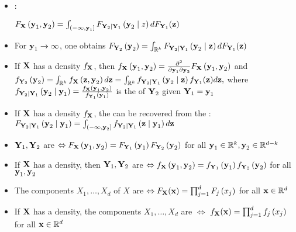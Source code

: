 \begin{itemize}[leftmargin=*]
    \item {}:
    
$
F_{\vect{X}}\left(\vect{y}_{1}, \vect{y}_{2}\right)=\int_{\left(-\infty, \vect{y}_{1}\right]} F_{\vect{Y}_{2} \mid \vect{Y}_{1}}\left(\vect{y}_{2} \mid z\right) d F_{\vect{Y}_{1}}(\vect{z})
$
    \item For $\y_{1} \rightarrow \infty$, one obtains
$
F_{\Y_{2}}\left(\y_{2}\right)=\int_{\mathbb{R}^{k}} F_{\Y_{2} \mid \Y_{1}}\left(\y_{2} \mid \z\right) d F_{\Y_{1}}(\z)
$
    \item If $\vect{X}$ has a density $f_{\vect{X}}$, then
$
f_{\vect{X}}\left(\vect{y}_{1}, \vect{y}_{2}\right)=\frac{\partial^{2}}{\partial \vect{y}_{1} \partial \vect{y}_{2}} F_{\vect{X}}\left(\vect{y}_{1}, \vect{y}_{2}\right)
$
and
$
f_{\vect{Y}_{2}}\left(\vect{y}_{2}\right)=\int_{\mathbb{R}^{k}} f_{\vect{X}}\left(\vect{z}, \vect{y}_{2}\right) d \vect{z}=\int_{\mathbb{R}^{k}} f_{\vect{Y}_{2} \mid \vect{Y}_{1}}\left(\vect{y}_{2} \mid \vect{z}\right) f_{\vect{Y}_{1}}(\vect{z}) d \vect{z},
$
where
$
f_{\vect{Y}_{2} \mid \vect{Y}_{1}}\left(\vect{y}_{2} \mid \vect{y}_{1}\right)=\frac{f_{\vect{X}}\left(\vect{y}_{1}, \vect{y}_{2}\right)}{f_{\vect{Y}_{1}}\left(\vect{y}_{1}\right)}
$
is the  of $\vect{Y}_{2}$ given $\vect{Y}_{1}=\vect{y}_{1}$
    \item If $\vect{X}$ has a density $f_{\vect{X}}$, the  can be recovered from the :
$
F_{\vect{Y}_{2} \mid \vect{Y}_{1}}\left(\vect{y}_{2} \mid \vect{y}_{1}\right)=\int_{\left(-\infty, \vect{y}_{2}\right]} f_{\vect{Y}_{2} \mid \vect{Y}_{1}}\left(\vect{z} \mid \vect{y}_{1}\right) d \vect{z}
$
    \item $\vect{Y}_{1}, \vect{Y}_{2}$ are  $\Leftrightarrow F_{\vect{X}}\left(\vect{y}_{1}, \vect{y}_{2}\right)=F_{\vect{Y}_{1}}\left(\vect{y}_{1}\right) F_{\vect{Y}_{2}}\left(\vect{y}_{2}\right)$ for all $\vect{y}_{1} \in \mathbb{R}^{k}, \vect{y}_{2} \in \mathbb{R}^{d-k}$
    \item If $\X$ has a density, then $\vect{Y}_{1}, \vect{Y}_{2}$ are  $\Leftrightarrow f_{\vect{X}}\left(\vect{y}_{1}, \vect{y}_{2}\right)=f_{\vect{Y}_{1}}\left(\vect{y}_{1}\right) f_{\vect{Y}_{2}}\left(\vect{y}_{2}\right)$ for all $\vect{y}_{1}, \vect{y}_{2}$
    \item The components $X_{1}, \ldots, X_{d}$ of $X$ are  $\Leftrightarrow F_{\vect{X}}(\vect{x})=\prod_{j=1}^{d} F_{j}\left(x_{j}\right)$ for all $\vect{x} \in \mathbb{R}^{d}$
    \item If $\vect{X}$ has a density, the components $X_{1}, \ldots, X_{d}$ are  $\Leftrightarrow$ $f_{\vect{X}}(\vect{x})=\prod_{j=1}^{d} f_{j}\left(x_{j}\right)$ for all $\vect{x} \in \mathbb{R}^{d}$

\end{itemize}









